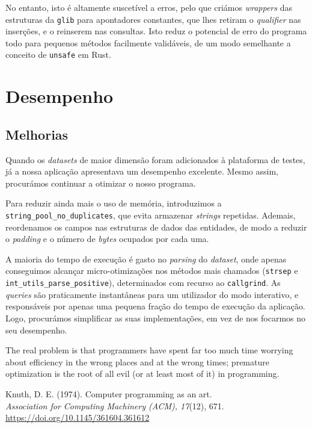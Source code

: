 \documentclass[11pt, a4paper]{article}
\begin{document}
No entanto, isto é altamente suscetível a erros, pelo que criámos \emph{wrappers} das estruturas da
\texttt{glib} para apontadores constantes, que lhes retiram o \emph{qualifier} nas inserções, e o
reinserem nas consultas. Isto reduz o potencial de erro do programa todo para pequenos métodos
facilmente validáveis, de um modo semelhante a conceito de \texttt{unsafe} em Rust.

\section{Desempenho}
\label{sec:performance}

\subsection{Melhorias}
\label{sec:performance-improvements}

Quando os \emph{datasets} de maior dimensão foram adicionados à plataforma de testes, já a nossa
aplicação apresentava um desempenho excelente. Mesmo assim, procurámos continuar a otimizar o nosso
programa.

Para reduzir ainda mais o uso de memória, introduzimos a \texttt{string\_pool\_no\_duplicates}, que
evita armazenar \emph{strings} repetidas. Ademais, reordenamos os campos nas estruturas de dados das
entidades, de modo a reduzir o \emph{padding} e o número de \emph{bytes} ocupados por cada uma.

A maioria do tempo de execução é gasto no \emph{parsing} do \emph{dataset}, onde apenas conseguimos
alcançar micro-otimizações nos métodos mais chamados (\texttt{strsep} e
\texttt{int\_utils\_parse\_positive}), determinados com recurso ao \texttt{callgrind}. As
\emph{queries} são praticamente instantâneas para um utilizador do modo interativo, e responsáveis
por apenas uma pequena fração do tempo de execução da aplicação. Logo, procurámos simplificar
as suas implementações, em vez de nos focarmos no seu desempenho.

\hspace{1cm}\parbox{15cm}{\small
    The real problem is that programmers have spent far too much time worrying about efficiency in
    the wrong places and at the wrong times; premature optimization is the root of all evil (or at
    least most of it) in programming.

    \begin{flushright}
        Knuth, D. E. (1974). Computer programming as an art. \\
        \emph{Association for Computing Machinery (ACM), 17}(12), 671. \\
        \url{https://doi.org/10.1145/361604.361612}
    \end{flushright}
}
\end{document}
